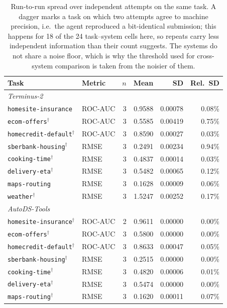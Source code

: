 \begin{table}[t]
\centering
\caption{Run-to-run spread over independent attempts on the same task. A dagger marks a task on which two attempts agree to machine precision, i.e.\ the agent reproduced a bit-identical submission; this happens for 18 of the 24 task--system cells here, so repeats carry less independent information than their count suggests. The systems do not share a noise floor, which is why the threshold used for cross-system comparison is taken from the noisier of them.}
\label{tab:noise}
\small
\begin{tabular}{llrrrr}
\toprule
Task & Metric & $n$ & Mean & SD & Rel.\ SD \\
\midrule
\multicolumn{6}{l}{\itshape Terminus-2} \\
\texttt{homesite-insurance} & ROC-AUC & 3 & 0.9588 & 0.00078 & 0.08\% \\
\texttt{ecom-offers}$^{\dagger}$ & ROC-AUC & 3 & 0.5585 & 0.00419 & 0.75\% \\
\texttt{homecredit-default}$^{\dagger}$ & ROC-AUC & 3 & 0.8590 & 0.00027 & 0.03\% \\
\texttt{sberbank-housing}$^{\dagger}$ & RMSE & 3 & 0.2491 & 0.00234 & 0.94\% \\
\texttt{cooking-time}$^{\dagger}$ & RMSE & 3 & 0.4837 & 0.00014 & 0.03\% \\
\texttt{delivery-eta}$^{\dagger}$ & RMSE & 3 & 0.5482 & 0.00065 & 0.12\% \\
\texttt{maps-routing} & RMSE & 3 & 0.1628 & 0.00009 & 0.06\% \\
\texttt{weather}$^{\dagger}$ & RMSE & 3 & 1.5247 & 0.00252 & 0.17\% \\
\midrule
\multicolumn{6}{l}{\itshape AutoDS-Tools} \\
\texttt{homesite-insurance}$^{\dagger}$ & ROC-AUC & 2 & 0.9611 & 0.00000 & 0.00\% \\
\texttt{ecom-offers}$^{\dagger}$ & ROC-AUC & 3 & 0.5800 & 0.00000 & 0.00\% \\
\texttt{homecredit-default}$^{\dagger}$ & ROC-AUC & 3 & 0.8633 & 0.00047 & 0.05\% \\
\texttt{sberbank-housing}$^{\dagger}$ & RMSE & 3 & 0.2515 & 0.00000 & 0.00\% \\
\texttt{cooking-time}$^{\dagger}$ & RMSE & 3 & 0.4820 & 0.00006 & 0.01\% \\
\texttt{delivery-eta}$^{\dagger}$ & RMSE & 3 & 0.5474 & 0.00000 & 0.00\% \\
\texttt{maps-routing}$^{\dagger}$ & RMSE & 3 & 0.1620 & 0.00011 & 0.07\% \\

\end{tabular}
\end{table}
